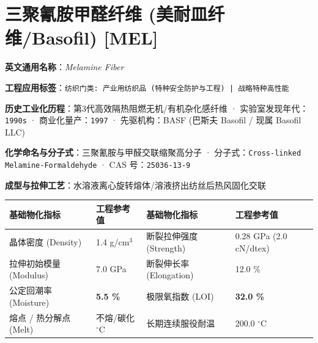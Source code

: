 \documentclass[11pt,openright,twoside,UTF8]{ctexbook}
\begin{document}
\section{三聚氰胺甲醛纤维 (美耐皿纤维/Basofil) [MEL]}
\label{sec:mel}

\noindent\textbf{英文通用名称}：\textit{Melamine Fiber}\par
\noindent\textbf{工程应用标签}：\texttt{纺织门类: 产业用纺织品 (特种安全防护与工程) | 战略特种高性能}\par
\noindent\textbf{历史工业化历程}：第3代高效隔热阻燃无机/有机杂化感纤维 · 实验室发现年代：\texttt{1990s} · 商业化量产：\texttt{1997} · 先驱机构：BASF (巴斯夫 Basofil / 现属 Basofil LLC)\par
\noindent\textbf{化学命名与分子式}：三聚氰胺与甲醛交联缩聚高分子 · 分子式：\texttt{Cross-linked Melamine-Formaldehyde} · CAS 号：\texttt{25036-13-9}\par
\noindent\textbf{成型与拉伸工艺}：水溶液离心旋转熔体/溶液挤出纺丝后热风固化交联\par

\vspace{0.15cm}
\begin{center}
\small
\begin{tabularx}{\textwidth}{p{3.8cm}Xp{3.8cm}X}
\toprule
\textbf{基础物化指标} & \textbf{工程参考值} & \textbf{基础物化指标} & \textbf{工程参考值} \\
\midrule
晶体密度 (Density) & 1.4 g/cm$^3$ & 断裂拉伸强度 (Strength) & 0.28 GPa (2.0 cN/dtex) \\
拉伸初始模量 (Modulus) & 7.0 GPa & 断裂伸长率 (Elongation) & 12.0 \% \\
公定回潮率 (Moisture) & \textbf{5.5 \%} & 极限氧指数 (LOI) & \textbf{32.0 \%} \\
熔点 / 热分解点 (Melt) & 不熔/碳化 $^\circ\mathrm{C}$ & 长期连续服役耐温 & 200.0 $^\circ\mathrm{C}$ \\
\bottomrule
\end{tabularx}
\end{center}
\vspace{0.15cm}
\end{document}
